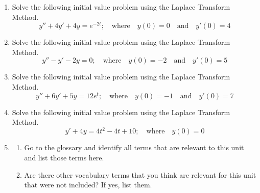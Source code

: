 \newpage
{}

\begin{enumerate} 
\item Solve the following initial value problem using the Laplace Transform Method. \label{15HWproblem1}
\[
y''+4y'+4y=e^{-2t}; \quad \text{where} \quad y(0)=0 \quad \text{and} \quad y'(0)=4
\]
\item Solve the following initial value problem using the Laplace Transform Method. \label{15HWproblem2}
\[
y''-y'-2y=0; \quad \text{where} \quad y(0)=-2 \quad \text{and} \quad y'(0)=5
\]
\item Solve the following initial value problem using the Laplace Transform Method. \label{15HWproblem3}
\[
y''+6y'+5y=12e^t; \quad \text{where} \quad y(0)=-1 \quad \text{and} \quad y'(0)=7
\]
\item Solve the following initial value problem using the Laplace Transform Method. \label{15HWproblem4}
\[
y'+4y=4t^2-4t+10; \quad \text{where} \quad y(0)=0
\]
\item \label{15HWproblem5}
\begin{enumerate}
\item Go to the glossary and identify all terms that are relevant to this unit and list those terms here.
\item Are there other vocabulary terms that you think are relevant for this unit that were not included? If yes, list them.
\end{enumerate}
\end{enumerate}








